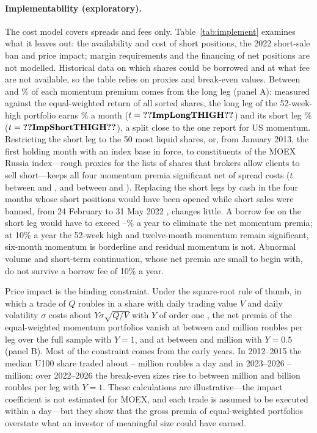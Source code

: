 \documentclass[11pt]{article}
\begin{document}
\paragraph{Implementability (exploratory).} The cost model covers spreads and fees only. Table~\ref{tab:implement}
examines what it leaves out: the availability and cost of short positions, the 2022 short-sale ban and price impact;
margin requirements and the financing of net positions are not modelled.
Historical data on which shares could be borrowed and at what fee are not available, so the table relies on proxies and
break-even values. Between  and \% of each momentum premium comes from the long leg
(panel A): measured against the equal-weighted return of all sorted shares, the long leg of the 52-week-high portfolio
earns \% a month ($t=\val{ImpLongTHIGH}$) and its short leg \%
($t=\val{ImpShortTHIGH}$), a split close to the one \citet{israel2013role} report for US momentum. Restricting the short
leg to the 50 most liquid shares, or, from January 2013, the first holding month with an index base in force, to
constituents of the MOEX Russia index---rough proxies for the lists of shares that brokers allow clients to sell short---keeps all four momentum premia
significant net of spread costs ($t$ between  and , and between  and
). Replacing the short legs by cash
in the four months whose short positions would have been opened while short sales were banned, from 24 February to
31 May 2022 \citep{cbr2022shortban}, changes little. A borrow fee on
the short leg would have to exceed --\% a year to eliminate the net momentum premia; at
10\% a year the 52-week high and twelve-month momentum remain significant, six-month momentum is borderline and residual
momentum is not. Abnormal volume and short-term continuation, whose net premia are small to begin with, do not
survive a borrow fee of 10\% a year.

Price impact is the binding constraint. Under the square-root rule of thumb, in which a trade of $Q$ roubles in a share
with daily trading value $V$ and daily volatility $\sigma$ costs about $Y\sigma\sqrt{Q/V}$ with $Y$ of order one
\citep{toth2011anomalous}, the net premia of the equal-weighted momentum portfolios vanish at between 
and  million roubles per leg over the full sample with $Y=1$, and at between  and
 million with $Y=0.5$ (panel B). Most of the constraint comes from the early years. In 2012--2015 the
median U100 share traded about -- million roubles a day and in 2023--2026
-- million; over 2022--2026 the break-even sizes rise to between 
million and  billion roubles per leg with $Y=1$. These calculations are illustrative---the impact
coefficient is not estimated for MOEX, and each trade is assumed to be executed within a day---but they show that the
gross premia of equal-weighted portfolios overstate what an investor of meaningful size could have earned.
\end{document}
